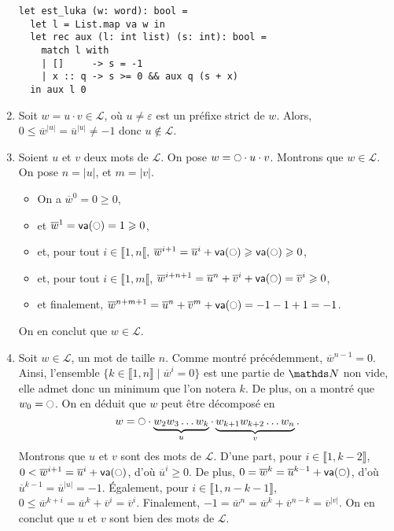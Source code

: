 \begin{enumerate}
\begin{lstlisting}[language=caml,caption=Fonction \texttt{est\_luka} testant si $w$ est un mot de \L ukasiewicz]
let est_luka (w: word): bool =
  let l = List.map va w in
  let rec aux (l: int list) (s: int): bool =
    match l with
    | []     -> s = -1
    | x :: q -> s >= 0 && aux q (s + x)
  in aux l 0
		\end{lstlisting}
	\item Soit $w = u \cdot v \in \mathcal{L}$, où $u \neq \varepsilon$ est un préfixe strict de $w$.
		Alors, $0 \le \overline w^{|u|} = \overline u^{|u|} \neq -1$ donc $u \not\in \mathcal{L}$.
	\item Soient $u$ et $v$ deux mots de $\mathcal{L}$. On pose $w = \circle \cdot u \cdot v$. Montrons que $w \in \mathcal{L}$. On pose $n = |u|$, et $m = |v|$.
		\begin{itemize}
			\item On a $\overline w^0 = 0 \ge 0$,
			\item et $\overline w^1 = \textsf{va}(\circle) = 1 \ge 0$,
			\item et, pour tout $i \in \llbracket 1,n \llbracket$, $\overline w^{i+1} = \overline u^i + \textsf{va}(\circle) \ge \textsf{va}(\circle) \ge 0$,
			\item et, pour tout $i \in \llbracket 1,m \llbracket$, $\overline w^{i+n+1} = \overline u^{n} + \overline v^i + \textsf{va}(\circle) = \overline v^i \ge 0$,
			\item et finalement, $\overline w^{n+m+1} = \overline u^n + \overline v^m + \textsf{va}(\circle) = -1 - 1 + 1 = -1$.
		\end{itemize}
		On en conclut que $w \in \mathcal{L}$.
	\item Soit $w \in \mathcal{L}$, un mot de taille $n$. Comme montré précédemment, $\overline w^{n-1} = 0$. Ainsi, l'ensemble $\{k \in \llbracket 1,n \rrbracket  \mid \overline w^i = 0\}$\/ est une partie de $\N$ non vide, elle admet donc un minimum que l'on notera $k$.
		De plus, on a montré que $w_0 = \circle$.
		On en déduit que $w$ peut être décomposé en \[
			w = \circle \cdot \underbrace{w_2w_3\ldots w_k}_{u} \cdot \underbrace{w_{k+1}w_{k+2}\ldots w_n}_v
		.\] Montrons que $u$ et $v$ sont des mots de $\mathcal{L}$.
		D'une part, pour $i \in \llbracket 1,k - 2 \rrbracket$, $0 < \overline w^{i+1} = \overline u^i + \textsf{va}(\circle)$, d'où $\overline u^i \ge 0$.
		De plus, $0 = \overline w^k = \overline u^{k-1} + \textsf{va}(\circle)$, d'où $\overline u^{k-1} = \overline u^{|u|} = -1$.
		Également, pour $i \in \llbracket 1,n-k-1 \rrbracket$, $0 \le \overline w^{k + i} = \overline w^k + \overline v^i = \overline v^i$.
		Finalement, $-1 = \overline w^{n} = \overline w^k + \overline v^{n-k} = \overline v^{|v|}$.
		On en conclut que $u$ et $v$ sont bien des mots de $\mathcal{L}$.


\end{enumerate}
